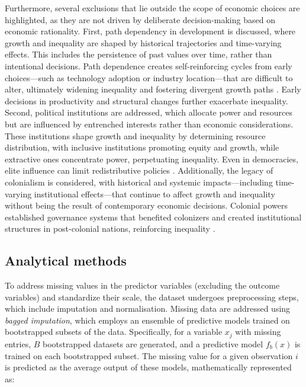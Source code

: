 \documentclass[12pt]{article}
\begin{document}
Furthermore, several exclusions that lie outside the scope of economic choices are highlighted, as they are not driven by deliberate decision-making based on economic rationality. First, path dependency in development is discussed, where growth and inequality are shaped by historical trajectories and time-varying effects. This includes the persistence of past values over time, rather than intentional decisions. Path dependence creates self-reinforcing cycles from early choices—such as technology adoption or industry location—that are difficult to alter, ultimately widening inequality and fostering divergent growth paths \parencite{david1985clio, atolia2012growth, halter2014inequality}. Early decisions in productivity and structural changes further exacerbate inequality. Second, political institutions are addressed, which allocate power and resources but are influenced by entrenched interests rather than economic considerations. These institutions shape growth and inequality by determining resource distribution, with inclusive institutions promoting equity and growth, while extractive ones concentrate power, perpetuating inequality. Even in democracies, elite influence can limit redistributive policies \parencite{acemoglu2001colonial, gilens2012affluence}. Additionally, the legacy of colonialism is considered, with historical and systemic impacts—including time-varying institutional effects—that continue to affect growth and inequality without being the result of contemporary economic decisions. Colonial powers established governance systems that benefited colonizers and created institutional structures in post-colonial nations, reinforcing inequality \parencite{NBERw11057, cypher2014development}.

\subsection{Analytical methods}

To address missing values in the predictor variables (excluding the outcome variables) and standardize their scale, the dataset undergoes preprocessing steps, which include imputation and normalisation. Missing data are addressed using \textit{bagged imputation}, which employs an ensemble of predictive models trained on bootstrapped subsets of the data. Specifically, for a variable \(x_j\) with missing entries, \(B\) bootstrapped datasets are generated, and a predictive model \(f_b(x)\) is trained on each bootstrapped subset. The missing value for a given observation \(i\) is predicted as the average output of these models, mathematically represented as:
\end{document}
